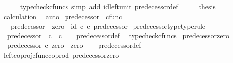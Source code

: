 \begin{isabellebody}
\ \ \ \ \isamarkupfalse%
\ {\isacharparenleft}{\kern0pt}typecheck{\isacharunderscore}{\kern0pt}cfuncs{\isacharcomma}{\kern0pt}\ simp\ add{\isacharcolon}{\kern0pt}\ id{\isacharunderscore}{\kern0pt}left{\isacharunderscore}{\kern0pt}unit{}\ predecessor{\isacharprime}{\kern0pt}{\isacharunderscore}{\kern0pt}def{}{\isacharparenright}{\kern0pt}\isanewline
\ \ \isamarkupfalse%
\ \isamarkupfalse%
\ {\isacharquery}{\kern0pt}thesis\isanewline
\ \ \ \ \isamarkupfalse%
\ calculation\ \isamarkupfalse%
\ auto\isanewline
{}\isamarkupfalse%
%
\endisatagproof
{\isafoldproof}%
%
\isadelimproof
\isanewline
%
\endisadelimproof
\isanewline
{}\isamarkupfalse%
\ predecessor\ {\isacharcolon}{\kern0pt}{\isacharcolon}{\kern0pt}\ {\isachardoublequoteopen}cfunc{\isachardoublequoteclose}\isanewline
\ \ \ {\isachardoublequoteopen}predecessor\ {\isacharequal}{\kern0pt}\ {\isacharparenleft}{\kern0pt}zero\ {\isasymamalg}\ id\ {\isasymnat}\isactrlsub c{\isacharparenright}{\kern0pt}\ {\isasymcirc}\isactrlsub c\ predecessor{\isacharprime}{\kern0pt}{\isachardoublequoteclose}\isanewline
\isanewline
{}\isamarkupfalse%
\ predecessor{\isacharunderscore}{\kern0pt}type{\isacharbrackleft}{\kern0pt}type{\isacharunderscore}{\kern0pt}rule{\isacharbrackright}{\kern0pt}{\isacharcolon}{\kern0pt}\isanewline
\ \ {\isachardoublequoteopen}predecessor\ {\isacharcolon}{\kern0pt}\ {\isasymnat}\isactrlsub c\ {\isasymrightarrow}\ {\isasymnat}\isactrlsub c{\isachardoublequoteclose}\isanewline
%
\isadelimproof
\ \ %
\endisadelimproof
%
\isatagproof
{}\isamarkupfalse%
\ predecessor{\isacharunderscore}{\kern0pt}def\ \isamarkupfalse%
\ typecheck{\isacharunderscore}{\kern0pt}cfuncs%
\endisatagproof
{\isafoldproof}%
%
\isadelimproof
\isanewline
%
\endisadelimproof
\isanewline
{}\isamarkupfalse%
\ predecessor{\isacharunderscore}{\kern0pt}zero{\isacharcolon}{\kern0pt}\isanewline
\ \ {\isachardoublequoteopen}predecessor\ {\isasymcirc}\isactrlsub c\ zero\ {\isacharequal}{\kern0pt}\ zero{\isachardoublequoteclose}\isanewline
%
\isadelimproof
\ \ %
\endisadelimproof
%
\isatagproof
{}\isamarkupfalse%
\ predecessor{\isacharunderscore}{\kern0pt}def\ \isanewline
\ \ \isamarkupfalse%
\ left{\isacharunderscore}{\kern0pt}coproj{\isacharunderscore}{\kern0pt}cfunc{\isacharunderscore}{\kern0pt}coprod\ predecessor{\isacharprime}{\kern0pt}{\isacharunderscore}{\kern0pt}zero\ \isamarkupfalse%

\end{isabellebody}
